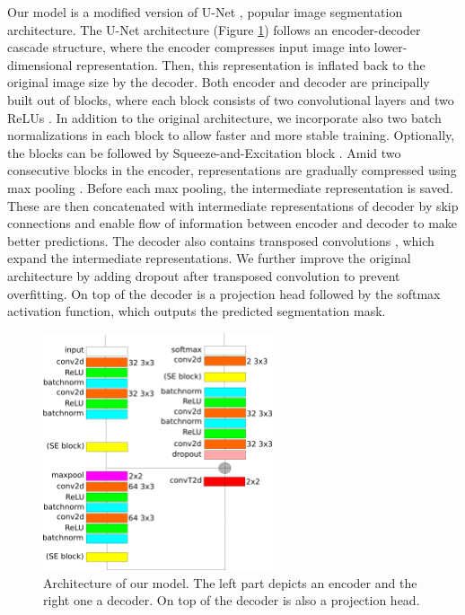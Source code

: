 \documentclass[9pt,conference,compsocconf, article]{IEEEtran}
\begin{document}
Our model is a modified version of U-Net \cite{ronneberger2015unet}, popular image segmentation architecture. The U-Net architecture (Figure \ref{fig:model_architecture}) follows an encoder-decoder cascade structure, where the encoder compresses input image into lower-dimensional representation. Then, this representation is inflated back to the original image size by the decoder. Both encoder and decoder are principally built out of blocks, where each block consists of two convolutional layers and two ReLUs \cite{agarap2018deep}. In addition to the original architecture, we incorporate also two batch normalizations \cite{ioffe2015batch} in each block to allow faster and more stable training. Optionally, the blocks can be followed by Squeeze-and-Excitation block \cite{hu2018squeeze}. Amid two consecutive blocks in the encoder, representations are gradually compressed using max pooling \cite{scherer2010evaluation}. Before each max pooling, the intermediate representation is saved. These are then concatenated with intermediate representations of decoder by skip connections \cite{he2016resnet} and enable flow of information between encoder and decoder to make better predictions. The decoder also contains transposed convolutions \cite{dumoulin2016aguide}, which expand the intermediate representations. We further improve the original architecture by adding dropout \cite{srivastava2014dropout} after transposed convolution to prevent overfitting. On top of the decoder is a projection head followed by the softmax activation function, which outputs the predicted segmentation mask.

\begin{figure}[h!]
    \centering
    \includegraphics[height=7cm]{images/model_architecture.png}
    \caption{Architecture of our model. The left part depicts an encoder and the right one a decoder. On top of the decoder is also a projection head.}
    \label{fig:model_architecture}
\end{figure}
\end{document}
